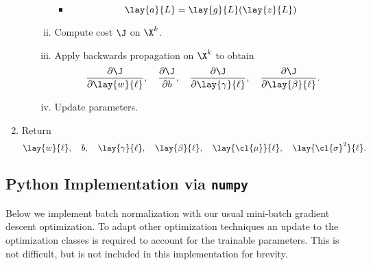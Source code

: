 \begin{enumerate}[1.]
\begin{enumerate}[a.]
\begin{enumerate}[i.]
\begin{itemize}
				\item $$\lay{a}{L}=\lay{g}{L}(\lay{z}{L})$$
			\end{itemize}
			\item Compute cost $\J$ on $\X^k$.
			\item Apply backwards propagation on $\X^k$ to obtain
			$$\frac{\partial\J}{\partial\lay{w}{\ell}},\quad\frac{\partial\J}{\partial b},\quad\frac{\partial\J}{\partial\lay{\gamma}{\ell}},\quad\frac{\partial\J}{\partial\lay{\beta}{\ell}}.$$
			\item Update parameters.
		\end{enumerate}
	\end{enumerate}
	\item Return
	$$\lay{w}{\ell},\quad b,\quad\lay{\gamma}{\ell},\quad\lay{\beta}{\ell},\quad\lay{\cl{\mu}}{\ell},\quad\lay{\cl{\sigma}^2}{\ell}.$$
\end{enumerate}








\subsection{Python Implementation via \texttt{numpy}}

Below we implement batch normalization with our usual mini-batch gradient descent optimization.  To adapt other optimization techniques an update to the optimization classes is required to account for the trainable parameters.  This is not difficult, but is not included in this implementation for brevity.









